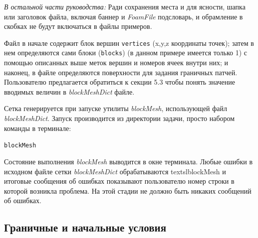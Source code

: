 \textit{В остальной части руководства:}
Ради сохранения места и для ясности, шапка или заголовок файла, включая баннер и \textsl{FoamFile} подсловарь,
 и обрамление в скобках не будут включаться в файлы примеров.

Файл в начале содержит блок вершин \texttt{vertices} (x,y,z координаты точек); затем в нем определяются сами блоки
 (\texttt{blocks})  (в данном примере имеется только 1) с помощью описанных выше меток вершин и номеров
 ячеек внутри них; и наконец, в файле определяются поверхности для задания граничных патчей.
 Пользователю предлагается обратиться к секции 5.3 чтобы понять значение вводимых  величин в \textsl{blockMeshDict} файле.

Сетка генерируется при запуске утилиты \textsl{blockMesh}, использующей файл \textsl{blockMeshDict}.
Запуск производится из директории задачи, просто набором команды в терминале:

\texttt{blockMesh}

Состояние выполнения \textsl{blockMesh} выводится в окне терминала. Любые ошибки в исходном 
файле сетки \textsl{blockMeshDict} обрабатываются textsl{blockMesh} и итоговые сообщения об ошибках показывают 
пользователю номер строки в которой возникла проблема. На этой стадии не должно быть никаких сообщений об ошибках.

\subsection{Граничные и начальные условия}
\label{sec:2.1.1.2}
